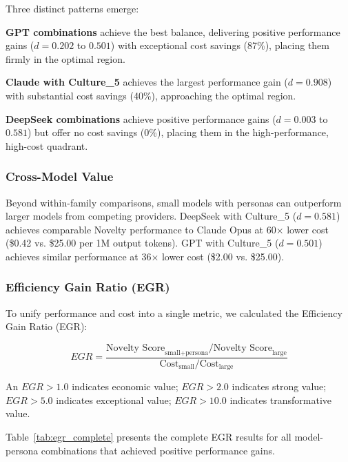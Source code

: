 \documentclass{article}
\begin{document}
Three distinct patterns emerge:

\textbf{GPT combinations} achieve the best balance, delivering positive performance gains ($d = 0.202$ to $0.501$) with exceptional cost savings (87\%), placing them firmly in the optimal region.

\textbf{Claude with Culture\_5} achieves the largest performance gain ($d = 0.908$) with substantial cost savings (40\%), approaching the optimal region.

\textbf{DeepSeek combinations} achieve positive performance gains ($d = 0.003$ to $0.581$) but offer no cost savings (0\%), placing them in the high-performance, high-cost quadrant.

\subsubsection{Cross-Model Value}

Beyond within-family comparisons, small models with personas can outperform larger models from competing providers. DeepSeek with Culture\_5 ($d = 0.581$) achieves comparable Novelty performance to Claude Opus at 60× lower cost (\$0.42 vs. \$25.00 per 1M output tokens). GPT with Culture\_5 ($d = 0.501$) achieves similar performance at 36× lower cost (\$2.00 vs. \$25.00).

\subsubsection{Efficiency Gain Ratio (EGR)}

To unify performance and cost into a single metric, we calculated the Efficiency Gain Ratio (EGR):

\begin{equation}
EGR = \frac{\text{Novelty Score}_{\text{small+persona}} / \text{Novelty Score}_{\text{large}}}{\text{Cost}_{\text{small}} / \text{Cost}_{\text{large}}}
\end{equation}

An $EGR > 1.0$ indicates economic value; $EGR > 2.0$ indicates strong value; $EGR > 5.0$ indicates exceptional value; $EGR > 10.0$ indicates transformative value.

Table~\ref{tab:egr_complete} presents the complete EGR results for all model-persona combinations that achieved positive performance gains.
\end{document}
